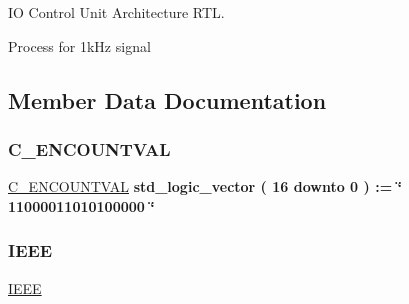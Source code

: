 IO Control Unit Architecture R\+TL. 

Process for 1k\+Hz signal 

\subsection{Member Data Documentation}
\mbox{\label{classio__ctrl_1_1rtl_a85d68696ce8aad74f4f3f0f5d6cb860a}} 
\subsubsection{\texorpdfstring{C\+\_\+\+E\+N\+C\+O\+U\+N\+T\+V\+AL}{C\_ENCOUNTVAL}}
{\footnotesize\ttfamily \hyperlink{classio__ctrl_1_1rtl_a85d68696ce8aad74f4f3f0f5d6cb860a}{C\+\_\+\+E\+N\+C\+O\+U\+N\+T\+V\+AL} {\bfseries \textcolor{comment}{std\+\_\+logic\+\_\+vector}\textcolor{vhdlchar}{ }\textcolor{vhdlchar}{(}\textcolor{vhdlchar}{ }\textcolor{vhdlchar}{ } \textcolor{vhdldigit}{16} \textcolor{vhdlchar}{ }\textcolor{keywordflow}{downto}\textcolor{vhdlchar}{ }\textcolor{vhdlchar}{ } \textcolor{vhdldigit}{0} \textcolor{vhdlchar}{ }\textcolor{vhdlchar}{)}\textcolor{vhdlchar}{ }\textcolor{vhdlchar}{ }\textcolor{vhdlchar}{ }\textcolor{vhdlchar}{\+:}\textcolor{vhdlchar}{=}\textcolor{vhdlchar}{ }\textcolor{vhdlchar}{ }\textcolor{vhdlchar}{ }\textcolor{vhdlchar}{ }\textcolor{keyword}{\char`\"{} 11000011010100000 \char`\"{}}\textcolor{vhdlchar}{ }} \hspace{0.3cm}{\ttfamily [Constant]}}

\mbox{\label{classio__ctrl_1_1rtl_ae4f03c286607f3181e16b9aa12d0c6d4}} 
\subsubsection{\texorpdfstring{I\+E\+EE}{IEEE}}
{\footnotesize\ttfamily \hyperlink{classio__ctrl_1_1rtl_ae4f03c286607f3181e16b9aa12d0c6d4}{I\+E\+EE}\hspace{0.3cm}{\ttfamily [Library]}}

\mbox{\label{classio__ctrl_1_1rtl_a5c1bd4d44af9b0f340317c2228eda942}} 
